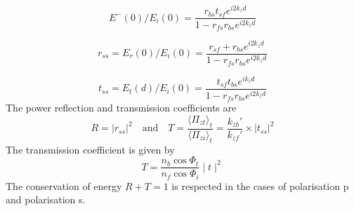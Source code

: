 \begin{equation*}
E^-(0) / E_i(0) =\frac{r_{bs} t_{sf} e^{i2k_z d}}{1-r_{fs}r_{bs}e^{i2k_z d}}
\end{equation*}

\begin{equation*}\label{eq:reflectivewave}
r_{ss} = E_r(0) / E_i(0) =
\frac{r_{sf} + r_{bs} e^{i2k_z d}}{1-r_{fs}r_{bs}e^{i2k_z d}}
\end{equation*}

\begin{equation*}\label{eq:transmittedwave}
t_{ss} = E_t(d) / E_i(0) =
\frac{t_{sf} t_{bs} e^{ik_z d}}{1 - r_{fs}r_{bs}e^{i2k_z d}}
\end{equation*}
The power reflection and transmission coefficients are
$$
R = |r_{ss}|^2
\quad\textrm{and}\quad
T = \frac{\langle \Pi_{zt} \rangle_t}{\langle \Pi_{zi} \rangle_t} 
= \frac{k_{zb}'}{k_{zf}'} \times |t_{ss}|^2
$$
The transmission coefficient is given by
\begin{equation*}
T=\frac{n_b\cos\Phi _t}{n_f\cos\Phi _i}\mid t\mid^2
\end{equation*}
The conservation of energy $R+T=1$ is respected in the cases of polarisation p and polarisation s.


